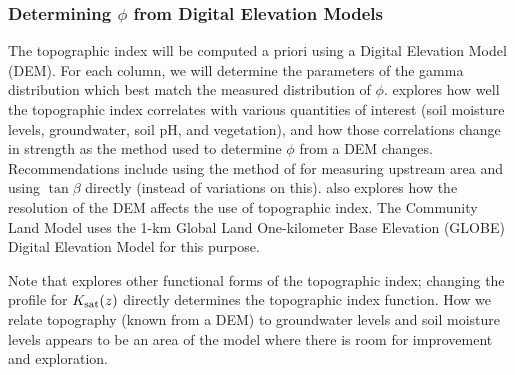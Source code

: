 \documentclass[twoside,10pt]{report}
\begin{document}


\subsubsection{Determining $\phi$ from Digital Elevation Models}\label{sec:DEM_discussion}
The topographic index will be computed a priori using a Digital Elevation Model (DEM). For each column, we will determine the parameters of the gamma distribution which best match the measured distribution of $\phi$. \citet{Sorensen06} explores how well the topographic index correlates with various quantities of interest (soil moisture levels, groundwater, soil pH, and vegetation), and how those correlations change in strength as the method used to determine $\phi$ from a DEM changes. Recommendations include using the method of \citet{Tarboton} for measuring upstream area and using $\tan{\beta}$ directly (instead of variations on this). \citet{Sorensen0779} also explores how the resolution of the DEM affects the use of topographic index. The Community Land Model uses the 1-km Global Land One-kilometer Base Elevation (GLOBE) Digital Elevation Model for this purpose.

Note that \citet{Ambroise96} explores other functional forms of the topographic index; changing the profile for $K_{\rm sat}(z)$ directly determines the topographic index function. How we relate topography (known from a DEM) to groundwater levels and soil moisture levels appears to be an area of the model where there is room for improvement and exploration.
\end{document}
